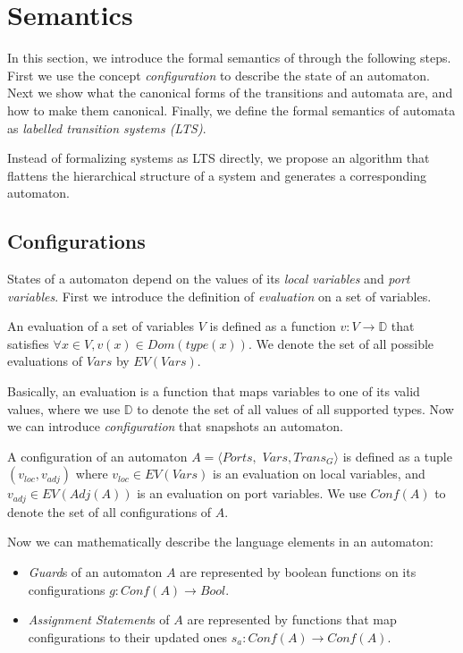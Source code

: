 \section{Semantics}
\label{sec:semantics}

In this section, we introduce the formal semantics of \lang{} through the following steps. First we use the concept \emph{configuration} to describe the state of an automaton. Next we show what the canonical forms of the transitions and automata are, and how to make them canonical. Finally, we define the formal semantics of automata as \emph{labelled transition systems (LTS)}.

Instead of formalizing systems as LTS directly, we propose an algorithm that flattens the hierarchical structure of a system and generates a corresponding automaton.

\subsection{Configurations}
\label{subsec:config}
States of a \lang{} automaton depend on the values of its \emph{local variables} and \emph{port variables}. First we introduce the definition of \emph{evaluation} on a set of variables. 

\begin{definition}[Evaluation]
An evaluation of a set of variables $V$ is defined as a function $v:V\rightarrow \mathbb{D}$ that satisfies $\forall x\in V,v(x)\in Dom(type(x))$. We denote the set of all possible evaluations of $Vars$ by $EV(Vars)$.
\end{definition}

Basically, an evaluation is a function that maps variables to one of its valid values, where we use $\mathbb{D}$ to denote the set of all values of all supported types. Now we can introduce \emph{configuration} that snapshots an automaton.

\begin{definition}[Configuration] A configuration of an automaton $A=\langle Ports,$ $Vars,Trans_G\rangle$ is defined as a tuple $(v_{loc},v_{adj})$ where $v_{loc}\in EV(Vars)$ is an evaluation on local variables, and $v_{adj}\in EV(Adj(A))$ is an evaluation on port variables. We use $Conf(A)$ to denote the set of all configurations of $A$.
\end{definition}

Now we can mathematically describe the language elements in an automaton:
\begin{itemize}
    \item \emph{Guard}s of an automaton $A$ are represented by boolean functions on its configurations $g:Conf(A)\rightarrow Bool$.
    \item \emph{Assignment Statement}s of $A$ are represented by functions that map configurations to their updated ones $s_a:Conf(A)\rightarrow Conf(A)$.
\end{itemize}

